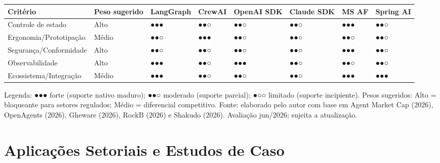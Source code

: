 \documentclass[12pt,a4paper]{article}
\begin{document}
\begin{center}
{\footnotesize
\setlength{\tabcolsep}{4pt}
\begin{tabularx}{\linewidth}{>{\raggedright\arraybackslash}X>{\centering\arraybackslash}X>{\centering\arraybackslash}X>{\centering\arraybackslash}X>{\centering\arraybackslash}X>{\centering\arraybackslash}X>{\centering\arraybackslash}X>{\centering\arraybackslash}X}
\toprule
\textbf{Critério} & \textbf{Peso sugerido} & \textbf{LangGraph} & \textbf{CrewAI} & \textbf{OpenAI SDK} & \textbf{Claude SDK} & \textbf{MS AF} & \textbf{Spring AI} \\
\midrule
Controle de estado & Alto & ●●● & ●●○ & ●●○ & ●●○ & ●●● & ●●○ \\
Ergonomia/Prototipação & Médio & ●●○ & ●●● & ●●○ & ●●○ & ●●○ & ●●○ \\
Segurança/Conformidade & Alto & ●●○ & ●●○ & ●●○ & ●●○ & ●●● & ●●○ \\
Observabilidade & Alto & ●●● & ●●○ & ●●● & ●●○ & ●●○ & ●●○ \\
Ecossistema/Integração & Médio & ●●● & ●●○ & ●●○ & ●●○ & ●●● & ●●● \\
\bottomrule
\end{tabularx}
}
\end{center}

Legenda: ●●● forte (suporte nativo maduro); ●●○ moderado (suporte parcial); ●○○ limitado (suporte incipiente). Pesos sugeridos: Alto = bloqueante para setores regulados; Médio = diferencial competitivo. Fonte: elaborado pelo autor com base em Agent Market Cap (2026), OpenAgents (2026), Gheware (2026), RockB (2026) e Shakudo (2026). Avaliação jun/2026; sujeita a atualização.


\section{Aplicações Setoriais e Estudos de Caso}
\end{document}
